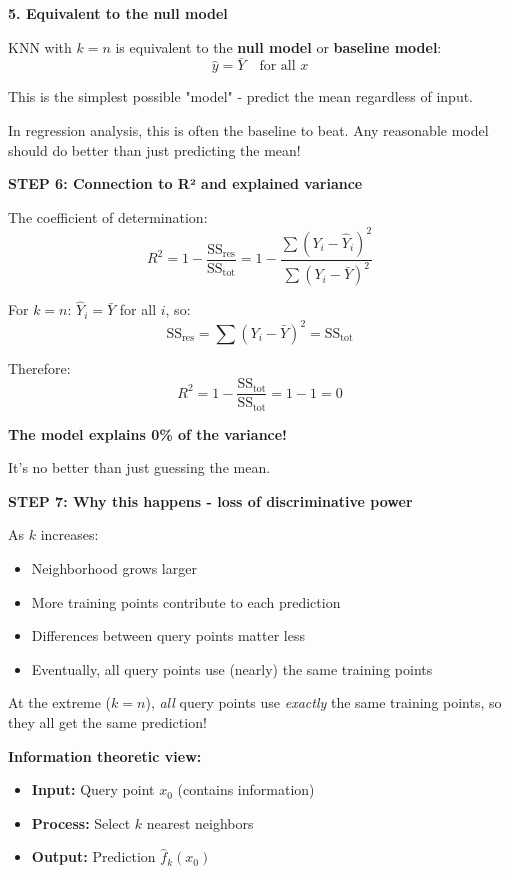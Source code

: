 \documentclass[12pt]{article}
\begin{document}
\begin{solution}
\textbf{5. Equivalent to the null model}

KNN with \(k=n\) is equivalent to the \textbf{null model} or \textbf{baseline model}:
\[
\hat{y} = \bar{Y} \quad \text{for all } x
\]

This is the simplest possible "model" - predict the mean regardless of input.

In regression analysis, this is often the baseline to beat. Any reasonable model should do better than just predicting the mean!

\textbf{STEP 6: Connection to R² and explained variance}

The coefficient of determination:
\[
R^2 = 1 - \frac{\text{SS}_{\text{res}}}{\text{SS}_{\text{tot}}} = 1 - \frac{\sum(Y_i - \hat{Y}_i)^2}{\sum(Y_i - \bar{Y})^2}
\]

For \(k=n\): \(\hat{Y}_i = \bar{Y}\) for all \(i\), so:
\[
\text{SS}_{\text{res}} = \sum(Y_i - \bar{Y})^2 = \text{SS}_{\text{tot}}
\]

Therefore:
\[
R^2 = 1 - \frac{\text{SS}_{\text{tot}}}{\text{SS}_{\text{tot}}} = 1 - 1 = 0
\]

\textbf{The model explains 0\% of the variance!}

It's no better than just guessing the mean.

\textbf{STEP 7: Why this happens - loss of discriminative power}

As \(k\) increases:
\begin{itemize}
    \item Neighborhood grows larger
    \item More training points contribute to each prediction
    \item Differences between query points matter less
    \item Eventually, all query points use (nearly) the same training points
\end{itemize}

At the extreme (\(k=n\)), \textit{all} query points use \textit{exactly} the same training points, so they all get the same prediction!

\textbf{Information theoretic view:}

\begin{itemize}
    \item \textbf{Input:} Query point \(x_0\) (contains information)
    \item \textbf{Process:} Select \(k\) nearest neighbors
    \item \textbf{Output:} Prediction \(\hat{f}_k(x_0)\)
\end{itemize}


\end{solution}
\end{document}
